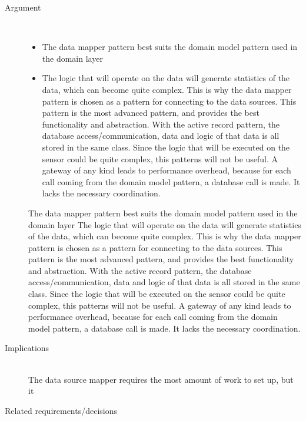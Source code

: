 \begin{description}
\item [Argument]~\\
\begin{itemize}
\item The data mapper pattern best suits the domain model pattern used in the domain layer
\item The logic that will operate on the data will generate statistics of the data, which can become quite complex. This is why the data mapper pattern is chosen as a pattern for connecting to the data sources. This pattern is the most advanced pattern, and provides the best functionality and abstraction.
With the active record pattern, the database access/communication, data and logic of that data is all stored in the same class. Since the logic that will be executed on the sensor could be quite complex, this patterns will not be useful.
A gateway of any kind leads to performance overhead, because for each call coming from the domain model pattern, a database call is made. It lacks the necessary coordination.
\end{itemize}
The data mapper pattern best suits the domain model pattern used in the domain layer
The logic that will operate on the data will generate statistics of the data, which can become quite complex. This is why the data mapper pattern is chosen as a pattern for connecting to the data sources. This pattern is the most advanced pattern, and provides the best functionality and abstraction.
With the active record pattern, the database access/communication, data and logic of that data is all stored in the same class. Since the logic that will be executed on the sensor could be quite complex, this patterns will not be useful.
A gateway of any kind leads to performance overhead, because for each call coming from the domain model pattern, a database call is made. It lacks the necessary coordination.


\item [Implications]~\\
The data source mapper requires the most amount of work to set up, but it 

\item [Related requirements/decisions]~\\
\end{description}
%
